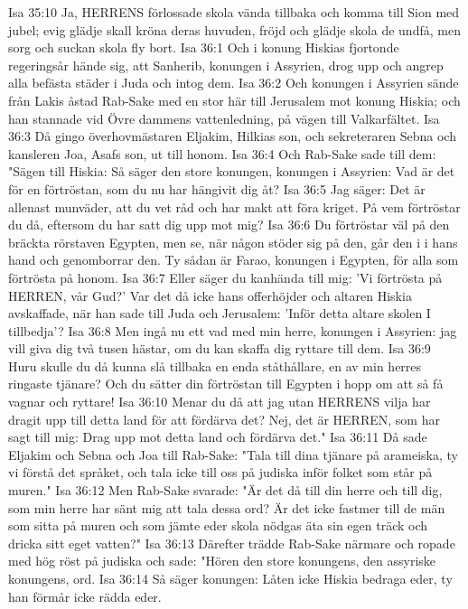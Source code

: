 Isa 35:10  Ja, HERRENS förlossade skola vända tillbaka och komma till Sion med jubel; evig glädje skall kröna deras huvuden, fröjd och glädje skola de undfå, men sorg och suckan skola fly bort.
Isa 36:1  Och i konung Hiskias fjortonde regeringsår hände sig, att Sanherib, konungen i Assyrien, drog upp och angrep alla befästa städer i Juda och intog dem.
Isa 36:2  Och konungen i Assyrien sände från Lakis åstad Rab-Sake med en stor här till Jerusalem mot konung Hiskia; och han stannade vid Övre dammens vattenledning, på vägen till Valkarfältet.
Isa 36:3  Då gingo överhovmästaren Eljakim, Hilkias son, och sekreteraren Sebna och kansleren Joa, Asafs son, ut till honom.
Isa 36:4  Och Rab-Sake sade till dem: "Sägen till Hiskia: Så säger den store konungen, konungen i Assyrien: Vad är det för en förtröstan, som du nu har hängivit dig åt?
Isa 36:5  Jag säger: Det är allenast munväder, att du vet råd och har makt att föra kriget. På vem förtröstar du då, eftersom du har satt dig upp mot mig?
Isa 36:6  Du förtröstar väl på den bräckta rörstaven Egypten, men se, när någon stöder sig på den, går den i i hans hand och genomborrar den. Ty sådan är Farao, konungen i Egypten, för alla som förtrösta på honom.
Isa 36:7  Eller säger du kanhända till mig: 'Vi förtrösta på HERREN, vår Gud?' Var det då icke hans offerhöjder och altaren Hiskia avskaffade, när han sade till Juda och Jerusalem: 'Inför detta altare skolen I tillbedja'?
Isa 36:8  Men ingå nu ett vad med min herre, konungen i Assyrien: jag vill giva dig två tusen hästar, om du kan skaffa dig ryttare till dem.
Isa 36:9  Huru skulle du då kunna slå tillbaka en enda ståthållare, en av min herres ringaste tjänare? Och du sätter din förtröstan till Egypten i hopp om att så få vagnar och ryttare!
Isa 36:10  Menar du då att jag utan HERRENS vilja har dragit upp till detta land för att fördärva det? Nej, det är HERREN, som har sagt till mig: Drag upp mot detta land och fördärva det."
Isa 36:11  Då sade Eljakim och Sebna och Joa till Rab-Sake: "Tala till dina tjänare på arameiska, ty vi förstå det språket, och tala icke till oss på judiska inför folket som står på muren."
Isa 36:12  Men Rab-Sake svarade: "Är det då till din herre och till dig, som min herre har sänt mig att tala dessa ord? Är det icke fastmer till de män som sitta på muren och som jämte eder skola nödgas äta sin egen träck och dricka sitt eget vatten?"
Isa 36:13  Därefter trädde Rab-Sake närmare och ropade med hög röst på judiska och sade: "Hören den store konungens, den assyriske konungens, ord.
Isa 36:14  Så säger konungen: Låten icke Hiskia bedraga eder, ty han förmår icke rädda eder.
